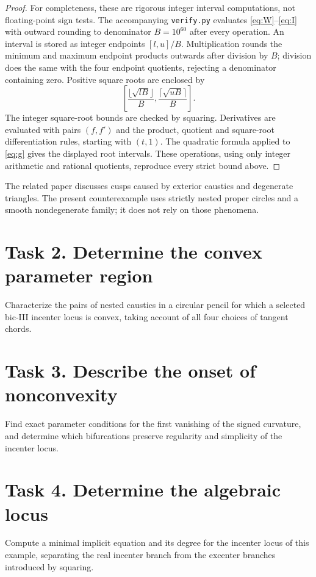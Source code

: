 \documentclass[11pt]{article}
\begin{document}
\begin{proof}
For completeness, these are rigorous integer interval computations,
not floating-point sign tests. The accompanying \texttt{verify.py}
evaluates \eqref{eq:W}--\eqref{eq:I} with outward rounding to denominator
$B=10^{60}$ after every operation. An interval is stored as integer
endpoints $[l,u]/B$. Multiplication rounds the minimum and maximum
endpoint products outwards after division by $B$; division does the
same with the four endpoint quotients, rejecting a denominator
containing zero. Positive square roots are enclosed by
\[
 \left[\frac{\lfloor\sqrt{lB}\rfloor}{B},
 \frac{\lceil\sqrt{uB}\rceil}{B}\right].
\]
The integer square-root bounds are checked by squaring.
Derivatives are evaluated with pairs $(f,f')$ and the product,
quotient and square-root differentiation rules, starting with $(t,1)$.
The quadratic formula applied to \eqref{eq:g} gives the displayed
root intervals. These operations, using only integer arithmetic and
rational quotients, reproduce every strict bound above.
\end{proof}

The related paper \cite{hyperbolic} discusses cusps caused by exterior
caustics and degenerate triangles. The present counterexample uses
strictly nested proper circles and a smooth nondegenerate family;
it does not rely on those phenomena.

\section*{Task 2. Determine the convex parameter region}
Characterize the pairs of nested caustics in a circular pencil for
which a selected bic-III incenter locus is convex, taking account
of all four choices of tangent chords.

\section*{Task 3. Describe the onset of nonconvexity}
Find exact parameter conditions for the first vanishing of the signed
curvature, and determine which bifurcations preserve regularity and
simplicity of the incenter locus.

\section*{Task 4. Determine the algebraic locus}
Compute a minimal implicit equation and its degree for the incenter
locus of this example, separating the real incenter branch from
the excenter branches introduced by squaring.
\end{document}
